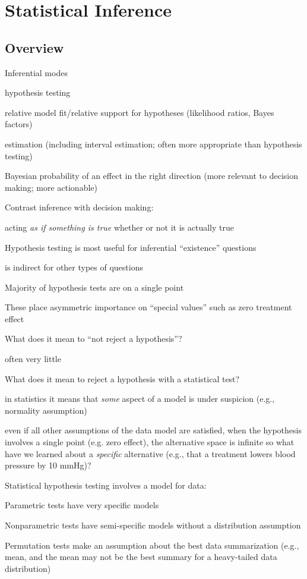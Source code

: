 
\chapter{Statistical Inference}
\section{Overview}
\bi
\item Inferential modes
  \bi
  \item hypothesis testing
  \item relative model fit/relative support for hypotheses (likelihood
    ratios, Bayes factors) 
  \item estimation (including interval estimation; often more appropriate than hypothesis testing) 
  \item Bayesian probability of an effect in the right direction (more
    relevant to decision making; more actionable)
  \ei
\item Contrast inference with decision making:
  \bi
  \item acting \emph{as if something is true} whether or not it is
    actually true
  \ei
\item Hypothesis testing is most useful for inferential ``existence'' questions
  \bi
  \item is indirect for other types of questions
  \ei
\item Majority of hypothesis tests are on a single point
\item These place asymmetric importance on ``special values'' such as
    zero treatment effect
\item What does it mean to ``not reject a hypothesis''?
  \bi
  \item often very little
  \ei
\item What does it mean to reject a hypothesis with a statistical test?
  \bi
  \item in statistics it means that \emph{some} aspect of a model is
    under suspicion (e.g., normality assumption)
  \item even if all other assumptions of the data model are satisfied,
    when the hypothesis involves a single point (e.g. zero 
    effect), the alternative space is infinite so what have we learned
    about a \emph{specific} alternative (e.g., that a treatment lowers
    blood pressure by 10 mmHg)?
  \ei
\ei

Statistical hypothesis testing involves a model for data:
\bi
\item Parametric tests have very specific models
\item Nonparametric tests have semi-specific models without a distribution assumption 
\item Permutation tests make an assumption about the best
  data summarization (e.g., mean, and the mean may not be the best
  summary for a heavy-tailed data distribution)
\ei

